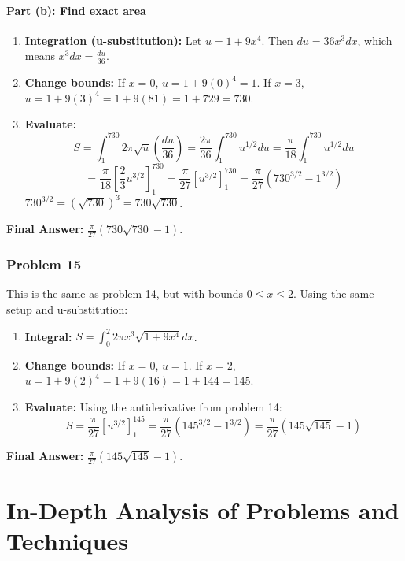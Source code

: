 \documentclass{article}
\begin{document}
\subsection{Part (b): Find exact area}
\begin{enumerate}
    \item \textbf{Integration (u-substitution):} Let \(u = 1+9x^4\).
    Then \(du = 36x^3 dx\), which means \(x^3 dx = \frac{du}{36}\).
    \item \textbf{Change bounds:}
    If \(x=0\), \(u = 1+9(0)^4 = 1\).
    If \(x=3\), \(u = 1+9(3)^4 = 1+9(81) = 1+729 = 730\).
    \item \textbf{Evaluate:}
    \[ S = \int_{1}^{730} 2\pi \sqrt{u} \left(\frac{du}{36}\right) = \frac{2\pi}{36} \int_{1}^{730} u^{1/2} du = \frac{\pi}{18} \int_{1}^{730} u^{1/2} du \]
    \[ = \frac{\pi}{18} \left[ \frac{2}{3} u^{3/2} \right]_{1}^{730} = \frac{\pi}{27} \left[ u^{3/2} \right]_{1}^{730} = \frac{\pi}{27} (730^{3/2} - 1^{3/2}) \]
    \(730^{3/2} = (\sqrt{730})^3 = 730\sqrt{730}\).
\end{enumerate}
\textbf{Final Answer:} \(\frac{\pi}{27}(730\sqrt{730} - 1)\).

\section{Problem 15}
This is the same as problem 14, but with bounds \(0 \le x \le 2\).
Using the same setup and u-substitution:
\begin{enumerate}
    \item \textbf{Integral:} \(S = \int_{0}^{2} 2\pi x^3 \sqrt{1+9x^4} dx\).
    \item \textbf{Change bounds:}
    If \(x=0\), \(u=1\).
    If \(x=2\), \(u = 1+9(2)^4 = 1+9(16) = 1+144 = 145\).
    \item \textbf{Evaluate:} Using the antiderivative from problem 14:
    \[ S = \frac{\pi}{27} \left[ u^{3/2} \right]_{1}^{145} = \frac{\pi}{27}(145^{3/2} - 1^{3/2}) = \frac{\pi}{27}(145\sqrt{145} - 1) \]
\end{enumerate}
\textbf{Final Answer:} \(\frac{\pi}{27}(145\sqrt{145} - 1)\).

\part*{In-Depth Analysis of Problems and Techniques}
\end{document}
